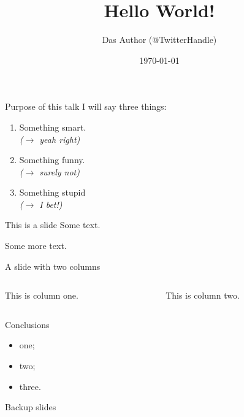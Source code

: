 \documentclass[aspectratio=43]{beamer}
\title{Hello World!}
\author{Das Author (@TwitterHandle)}
\date{\today}
\begin{document}
 
\begin{frame}[plain]
\titlepage
{}
\begin{center}

\end{center}
\end{frame}
 

\begin{frame}{Purpose of this talk}
    I will say three things:
    \medskip
    \begin{enumerate}
        \item Something smart.\\ \emph{($\rightarrow$ yeah right)}
        \medskip
        \item Something funny.\\ \emph{($\rightarrow$ surely not)}
        \medskip
        \item Something stupid\\ \emph{($\rightarrow$ I bet!)}
    \end{enumerate}
\end{frame}


\begin{frame}{This is a slide}
Some text.\bigskip

Some more text.\bigskip

\end{frame}
 

\begin{frame}[fragile]{A slide with two columns}
    \begin{columns}[<options>]
    \begin{column}{0.45\textwidth}
        This is column one.
    \end{column}
    \begin{column}{0.45\textwidth}
        This is column two.
    \end{column}
    \end{columns}
\end{frame}


\begin{frame}{Conclusions}
    \begin{itemize}
        \item one;
        \item two;
        \item three.
    \end{itemize}
\end{frame}


\begin{frame}{}
\begin{center}
\huge
Backup slides
\end{center}
\end{frame}
\end{document}
